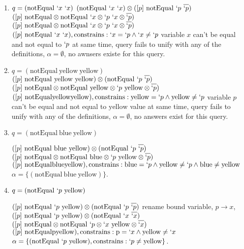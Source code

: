 \documentclass[11pt,a4paper]{report}
\newcommand{\var}[1]{`#1}
\newcommand{\unify}{\otimes}
\begin{document}
\begin{enumerate}
\item $q = (\text{notEqual}\ \var{x}\ \var{x})$
\subitem $(\text{notEqual}\ \var{x}\ \var{x}) \unify ([p]\ \text{notEqual}\ \var{p}\ \overline{\var{p}})$
\subitem $([p]\ \text{notEqual} \unify \text{notEqual}\ \var{x} \unify \var{p}\ \var{x} \unify \overline{\var{p}})$
\subitem $([p]\ \text{notEqual} \unify \text{notEqual}\ \var{x} \unify \var{p}\ \var{x} \unify \overline{\var{p}})$
\subitem $([p]\ \text{notEqual}\ \var{x}\ \var{x}), \text{constrains}: \var{x}=\var{p} \wedge \var{x} \neq \var{p}$
\subitem variable $x$ can't be equal and not equal to $\var{p}$ at same time,
\subitem query fails to unify with any of the definitions,
\subitem $\alpha=\emptyset$, no awnsers existe for this query.

\item $q = (\text{notEqual}\  \text{yellow}\ \text{yellow})$
\subitem $([p]\ \text{notEqual}\ \text{yellow}\ \text{yellow}) \unify (\text{notEqual}\ \var{p}\ \overline{\var{p}})$
\subitem $([p]\ \text{notEqual} \unify \text{notEqual}\ \text{yellow} \unify \var{p}\ \text{yellow} \unify \overline{\var{p}})$
\subitem $([p]\ \text{notEqual} \text{yellow} \text{yellow}), \text{constrains}: \text{yellow}=\var{p} \wedge \text{yellow} \neq \var{p}$
\subitem variable $p$ can't be equal and not equal to $\text{yellow}$ value at same time,
\subitem query fails to unify with any of the definitions,
\subitem $\alpha=\emptyset$, no answers exist for this query.

\item $q = (\text{notEqual}\  \text{blue}\ \text{yellow})$

\subitem $([p]\ \text{notEqual}\ \text{blue}\ \text{yellow}) \unify (\text{notEqual}\ \var{p}\ \overline{\var{p}})$
\subitem $([p]\ \text{notEqual} \unify \text{notEqual}\ \text{blue} \unify \var{p}\ \text{yellow} \unify \overline{\var{p}})$
\subitem $([p]\ \text{notEqual} \text{blue} \text{yellow}), \text{constrains}: \text{blue}=\var{p} \wedge \text{yellow} \neq \var{p} \wedge \text{blue} \neq \text{yellow}$
\subitem $\alpha=\{(\text{notEqual}\  \text{blue}\ \text{yellow})\}$.

\item $q = (\text{notEqual}\ \var{p}\ \text{yellow})$

\subitem $([p]\ \text{notEqual}\ \var{p}\ \text{yellow}) \unify (\text{notEqual}\ \var{p}\ \overline{\var{p}})$
\subitem rename bound variable, $p \rightarrow x$,
\subitem $([p]\ \text{notEqual}\ \var{p}\ \text{yellow}) \unify (\text{notEqual}\ \var{x}\ \overline{\var{x}})$
\subitem $([p]\ \text{notEqual} \unify \text{notEqual}\ \var{p} \unify \var{x}\ \text{yellow} \unify \overline{\var{x}})$
\subitem $([p]\ \text{notEqual} \text{p} \text{yellow}), \text{constrains}: \text{p}=\var{x} \wedge \text{yellow} \neq \var{x}$
\subitem $\alpha=\{(\text{notEqual}\  \var{p}\ \text{yellow}), \text{constrains}: \var{p} \neq \text{yellow}\}$.

\end{enumerate}
\end{document}

